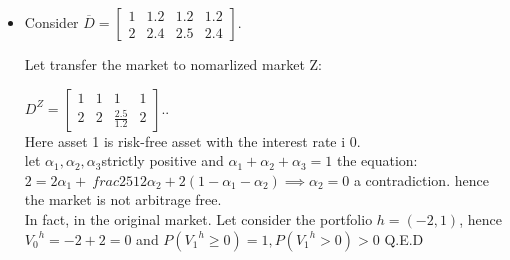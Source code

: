 \documentclass[12pt]{article}
\newcommand{\ol}{\overline}
\begin{document}
\begin{itemize}
\item Consider $\ol{D}=
    \left[\begin{array}{llll}
    1 & 1.2 & 1.2 & 1.2 \\
    2 & 2.4 & 2.5 & 2.4
    \end{array}
    \right]$.
   
  Let transfer the market to nomarlized market Z:
  
  $D^{Z} =
 \left[\begin{array}{llll}
    1 & 1& 1 & 1 \\
    2 & 2& \frac{2.5}{1.2} & 2
    \end{array}
    \right]$..\\
    
Here asset 1 is risk-free asset with the interest rate i $0$.\\
let $\alpha_{1}, \alpha_{2}, \alpha_{3} $strictly positive and $\alpha_{1} +\alpha_{2}+ \alpha_{3}=1$
the equation:\\
$2 = 2\alpha_{1} +\ frac{25}{12}\alpha_{2} + 2(1- \alpha_{1} -\alpha_{2}) \implies \alpha_{2} = 0$  a contradiction. hence the market is not arbitrage free.\\

In fact, in the original market. Let consider the portfolio $h= (-2,1)$, hence ${V_{0}}^{h}= -2+2 = 0$ and $P({V_{1}}^{h} \geq 0) = 1, P({V_{1}}^{h} >0) >0$ Q.E.D
 


\end{itemize}
\end{document}
